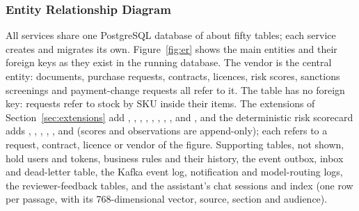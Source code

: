 \subsubsection{Entity Relationship Diagram}
All services share one PostgreSQL database of about fifty tables; each service creates and migrates its own. Figure~\ref{fig:er} shows the main entities and their foreign keys as they exist in the running database. The vendor is the central entity: documents, purchase requests, contracts, licences, risk scores, sanctions screenings and payment-change requests all refer to it. The  table has no foreign key: requests refer to stock by SKU inside their items. The extensions of Section~\ref{sec:extensions} add , , , , , , , ,  and , and the deterministic risk scorecard adds , , , , ,  and  (scores and observations are append-only); each refers to a request, contract, licence or vendor of the figure. Supporting tables, not shown, hold users and tokens, business rules and their history, the event outbox, inbox and dead-letter table, the Kafka event log, notification and model-routing logs, the reviewer-feedback tables, and the assistant's chat sessions and  index (one row per passage, with its 768-dimensional vector, source, section and audience).

